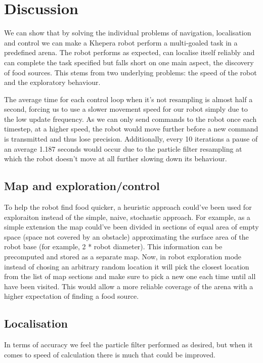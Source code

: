 \documentclass[paper=a4, fontsize=12pt]{scrartcl}	%
\numberwithin{equation}{section}		%
\numberwithin{figure}{section}			%
\numberwithin{table}{section}				%
\begin{document}
\section{Discussion}
We can show that by solving the individual problems of navigation, localisation and control we can make a Khepera robot perform a multi-goaled task in a predefined arena. The robot performs as expected, can localise itself reliably and can complete the task specified but falls short on one main aspect, the discovery of food sources. This stems from two underlying problems: the speed of the robot and the exploratory behaviour.

The average time for each control loop when it's not resampling is almost half a second, forcing us to use a slower movement speed for our robot simply due to the low update frequency. As we can only send commands to the robot once each timestep, at a higher speed, the robot would move further before a new command is transmitted and thus lose precision. Additionally, every 10 iterations a pause of an average 1.187 seconds would occur due to the particle filter resampling at which the robot doesn't move at all further slowing down its behaviour.

\subsection{Map and exploration/control}
To help the robot find food quicker, a heuristic approach could've been used for exploraiton instead of the simple, naive, stochastic approach. For example, as a simple extension the map could've been divided in sections of equal area of empty space (space not covered by an obstacle) approximating the surface area of the robot base (for example, 2 * robot diameter). This information can be precomputed and stored as a separate map. Now, in robot exploration mode instead of chosing an arbitrary random location it will pick the closest location from the list of map sections and make sure to pick a new one each time until all have been visited. This would allow a more reliable coverage of the arena with a higher expectation of finding a food source.

\subsection{Localisation}
In terms of accuracy we feel the particle filter performed as desired, but when it comes to speed of calculation there is much that could be improved.
\end{document}
